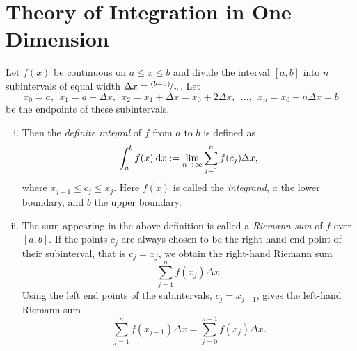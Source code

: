 \section{Theory of Integration in One Dimension}

\begin{definition}
Let $f(x)$ be continuous on $a \le x \le b$ and divide the interval
$[a,b]$ into $n$ subintervals of equal width $\Delta x = {}^{(b-a)}\!/_{n}$. Let
\[ x_0 = a, \:\: x_1 = a + \Delta x, \:\: x_2 = x_1 + \Delta x = x_0 + 2 \Delta x, \:\:
\dots, \:\: x_n = x_0 + n \Delta x = b \]
be the endpoints of these subintervals. 
\begin{enumerate}[(i)]
\item
Then the \emph{definite integral} of $f$ from $a$ to $b$ is defined as
\begin{equation}
\label{eq:def_itgr}
\int_{a}^{b} f(x) \: \mathrm{d} x := \lim_{n \to \infty} \sum_{j=1}^{n} f(c_j) \Delta x,
\end{equation}
where $x_{j-1} \le c_j \le x_{j}$. Here $f(x)$ is called the \emph{integrand}, $a$ the lower boundary, and $b$ the upper boundary.
\item
The sum appearing in the above definition is called a \emph{Riemann sum} of $f$ over $[a,b]$. If the points $c_j$ are always chosen to be the right-hand end point of their subinterval, that is $c_j=x_j$, we obtain the right-hand Riemann sum
\[ \sum_{j=1}^{n} f(x_j) \Delta x. \]
Using the left end points of the subintervals, $c_j=x_{j-1}$, gives the left-hand Riemann sum
\[ \sum_{j=1}^{n} f(x_{j-1}) \Delta x = \sum_{j=0}^{n-1} f(x_{j}) \Delta x. \]
\end{enumerate}	
\end{definition}

